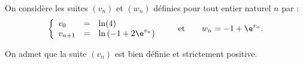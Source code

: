 \medskip


On considère les suites $(v_n)$ et $(w_n)$ définies pour tout entier naturel $n$
par :
\[ \left\{\begin{array}{l c l}
v_0 &=& \ln (4)\\
v_{n+1} &=& \ln \left(- 1 +2\e^{v_n}\right)
\end{array}\right. \qquad \text{et} \qquad w_n = - 1 + \e^{v_n}.\]

On admet que la suite $(v_n)$ est bien définie et strictement positive.












































































